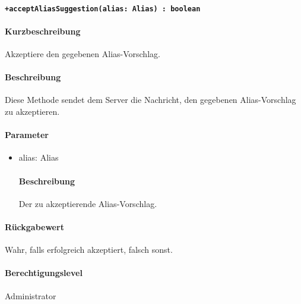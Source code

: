 \paragraph{\texttt{+acceptAliasSuggestion(alias: Alias) : boolean}}%
\paragraph*{Kurzbeschreibung}
Akzeptiere den gegebenen Alias-Vorschlag.
\paragraph*{Beschreibung}
Diese Methode sendet dem Server die Nachricht, den gegebenen Alias-Vorschlag zu akzeptieren.
\paragraph*{Parameter}
\begin{itemize}
    \item alias: Alias
            \paragraph*{Beschreibung}
            Der zu akzeptierende Alias-Vorschlag.
\end{itemize}
\paragraph*{Rückgabewert}
Wahr, falls erfolgreich akzeptiert, falsch sonst.
\paragraph*{Berechtigungslevel}
Administrator